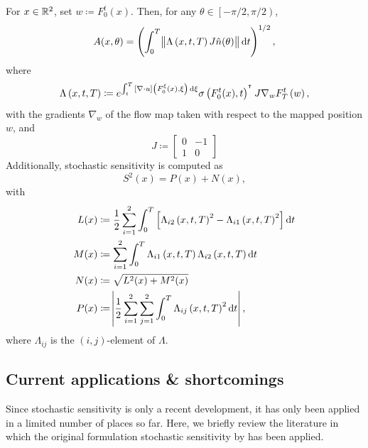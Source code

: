 \begin{theorem}\label{thm:orig_s2_calculation}
	For \(x \in \mathbb{R}^2\), set \(w \coloneqq F_0^t(x)\).
	Then, for any \(\theta \in \left[-\pi/2, \pi/2\right)\),
	\[
		A(x,\theta) = \left(\int_0^T{\norm{\Lambda\left(x, t, T\right)J\hat{n}(\theta)}\dif t}\right)^{1/2},
	\]
	where
	\[
		\Lambda\left(x,t,T\right) \coloneqq e^{\int_t^T{\left[\nabla \cdot u\right]\left(F_0^\xi(x), \xi\right)\dif\xi}}\sigma\left(F_0^t(x), t\right)^{\T}J \nabla_w F_T^t\left(w\right),
	\]
	with the gradients \(\nabla_w\) of the flow map taken with respect to the mapped position \(w\), and
	\[
		J \coloneqq \begin{bmatrix}
			0 & -1 \\
			1 & 0
		\end{bmatrix}
	\]
	Additionally, stochastic sensitivity is computed as
	\[
		S^2(x) = P(x) + N(x),
	\]
	with
	\begin{align*}
		L(x) & \coloneqq \frac12\sum_{i=1}^2\int_0^T\left[\Lambda_{i2}\left(x,t, T\right)^2 - \Lambda_{i1}\left(x,t,T\right)^2\right]\dif t \\
		M(x) & \coloneqq \sum_{i=1}^2\int_0^T{\Lambda_{i1}\left(x,t,T\right)\Lambda_{i2}\left(x,t,T\right)\dif t}                           \\
		N(x) & \coloneqq \sqrt{L^2(x) + M^2(x)}                                                                                             \\
		P(x) & \coloneqq \abs{\frac12\sum_{i=1}^2\sum_{j=1}^2{\int_0^T{\Lambda_{ij}\left(x,t,T\right)^2\dif t}}},
	\end{align*}
	where \(\Lambda_{ij}\) is the \((i,j)\)-element of \(\Lambda\).
\end{theorem}





\subsection{Current applications \& shortcomings}
Since stochastic sensitivity is only a recent development, it has only been applied in a limited number of places so far.
Here, we briefly review the literature in which the original formulation stochastic sensitivity by \citet{Balasuriya_2020_StochasticSensitivityComputable} has been applied.

